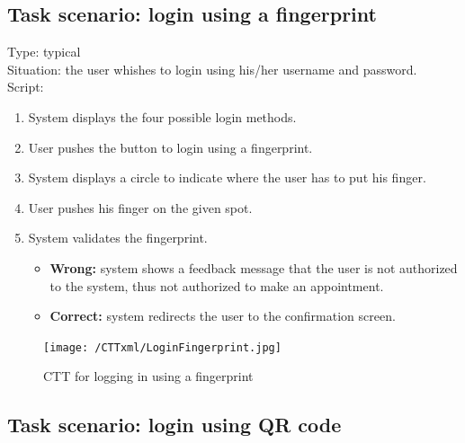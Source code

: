 \documentclass[11pt, a4paper,svglistings]{report}
\begin{document}

\subsection{\label{subsec:loginFinger}Task scenario: login using a fingerprint}

Type: typical \\
Situation: the user whishes to login using his/her username and password. \\
Script:
\begin{enumerate}
\item System displays the four possible login methods.
\item User pushes the button to login using a fingerprint.
\item System displays a circle to indicate where the user has to put his finger.
\item User pushes his finger on the given spot.
\item System validates the fingerprint.
\begin{itemize}
\item \textbf{Wrong:} system shows a feedback message that the user is not authorized to the system, thus not authorized to make an appointment.
\item \textbf{Correct:} system redirects the user to the  confirmation screen.
\end{itemize}
\end{enumerate}

\begin{figure}[H]
\centering
    \texttt{[image: /CTTxml/LoginFingerprint.jpg]}
  \caption[Fingerprint login CTT]{CTT for logging in using a fingerprint}
\end{figure}


\subsection{\label{subsec:loginNFC}Task scenario: login using QR code}
\end{document}
